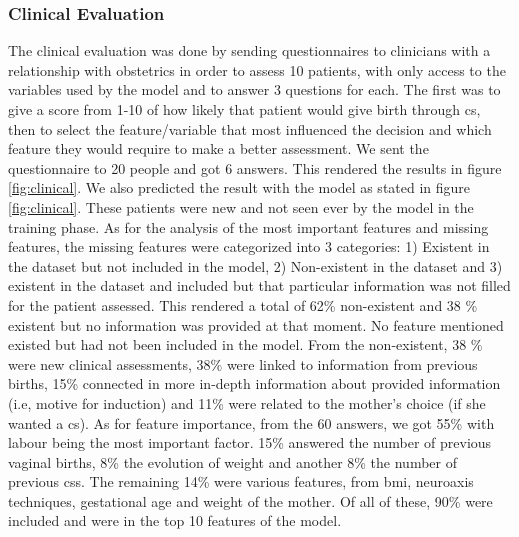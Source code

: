\subsubsection{Clinical Evaluation}
The clinical evaluation was done by sending questionnaires to clinicians with a relationship with obstetrics in order to assess 10 patients, with only access to the variables used by the model and to answer 3 questions for each. The first was to give a score from 1-10 of how likely that patient would give birth through \ac{cs}, then to select the feature/variable that most influenced the decision and which feature they would require to make a better assessment. We sent the questionnaire to 20 people and got 6 answers. This rendered the results in figure \ref{fig:clinical}. We also predicted the result with the model as stated in figure \ref{fig:clinical}. These patients were new and not seen ever by the model in the training phase. 
As for the analysis of the most important features and missing features, the missing features were categorized into 3 categories: 1) Existent in the dataset but not included in the model, 2) Non-existent in the dataset and 3) existent in the dataset and included but that particular information was not filled for the patient assessed. This rendered a total of 62\% non-existent and 38 \% existent but no information was provided at that moment. No feature mentioned existed but had not been included in the model. From the non-existent, 38 \% were new clinical assessments, 38\% were linked to information from previous births,  15\% connected in more in-depth information about provided information (i.e, motive for induction) and 11\% were related to the mother's choice (if she wanted a \ac{cs}).
As for feature importance, from the 60 answers, we got 55\% with labour being the most important factor. 15\% answered the number of previous vaginal births, 8\% the evolution of weight and another 8\% the number of previous \acp{cs}. The remaining 14\% were various features, from \ac{bmi}, neuroaxis techniques, gestational age and weight of the mother. Of all of these, 90\% were included and were in the top 10 features of the model.




